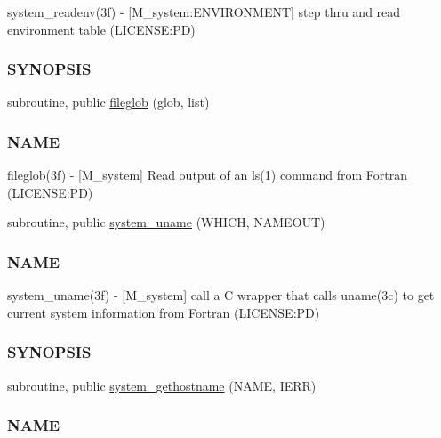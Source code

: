 \begin{DoxyCompactItemize}
\begin{DoxyCompactList}
system\+\_\+readenv(3f) -\/ \mbox{[}M\+\_\+system\+:E\+N\+V\+I\+R\+O\+N\+M\+E\+NT\mbox{]} step thru and read environment table (L\+I\+C\+E\+N\+SE\+:PD) \subsubsection*{S\+Y\+N\+O\+P\+S\+IS}\end{DoxyCompactList}\item 
subroutine, public \mbox{\hyperlink{namespacem__system_a79656f76ad75168302e0d770052e901e}{fileglob}} (glob, list)
\begin{DoxyCompactList}\small\item\em \subsubsection*{N\+A\+ME}

fileglob(3f) -\/ \mbox{[}M\+\_\+system\mbox{]} Read output of an ls(1) command from Fortran (L\+I\+C\+E\+N\+SE\+:PD) \end{DoxyCompactList}\item 
subroutine, public \mbox{\hyperlink{namespacem__system_a04e5d49509c44bcb2ccabfd80ec8cdfb}{system\+\_\+uname}} (W\+H\+I\+CH, N\+A\+M\+E\+O\+UT)
\begin{DoxyCompactList}\small\item\em \subsubsection*{N\+A\+ME}

system\+\_\+uname(3f) -\/ \mbox{[}M\+\_\+system\mbox{]} call a C wrapper that calls uname(3c) to get current system information from Fortran (L\+I\+C\+E\+N\+SE\+:PD) \subsubsection*{S\+Y\+N\+O\+P\+S\+IS}\end{DoxyCompactList}\item 
subroutine, public \mbox{\hyperlink{namespacem__system_a96fab225737afb77ff1cbba9866f0d05}{system\+\_\+gethostname}} (N\+A\+ME, I\+E\+RR)
\begin{DoxyCompactList}\small\item\em \subsubsection*{N\+A\+ME}


\end{DoxyCompactList}
\end{DoxyCompactItemize}
